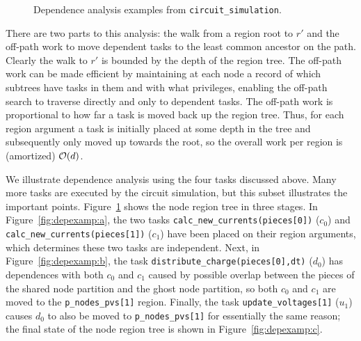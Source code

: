\begin{figure}
\centering
{}
\label{fig:depexamp}
\caption{Dependence analysis examples from {\tt circuit\_simulation}.}
\end{figure}

There are two parts to this analysis:
the walk from a region root to $r'$ and the off-path work
to move dependent tasks to the least common ancestor on the path.
Clearly the walk to $r'$ is bounded by the depth of the region tree.
The off-path work can be made efficient by maintaining at each node a
record of which subtrees have tasks in them and with what privileges,
enabling the off-path search to traverse directly and only to
dependent tasks.  The off-path work is proportional to how far a task
is moved back up the region tree.  Thus, for each region argument a
task is initially placed at some depth in the tree and subsequently
only moved up towards the root, so the overall work per region is (amortized)
${\cal O}(d)$.  

We illustrate dependence analysis using the four tasks discussed
above.  Many more tasks are executed by the circuit simulation,
but this subset illustrates the important
points. Figure~\ref{fig:depexamp} shows the node region tree in three
stages.  In Figure~\ref{fig:depexamp:a}, the two tasks
{\tt calc\_new\_currents(pieces[0])} ($c_0$) and {\tt
    calc\_new\_currents(pieces[1])} ($c_1$) have been placed on their region arguments,
  which determines these two tasks are independent.
Next, in Figure~\ref{fig:depexamp:b}, the task {\tt distribute\_charge(pieces[0],dt)} ($d_0$)
has dependences with both $c_0$ and $c_1$ caused by possible overlap between the pieces of the
shared node partition and the ghost node partition, so both $c_0$ and $c_1$ are moved to
the {\tt p\_nodes\_pvs[1]} region.  Finally, the task {\tt update\_voltages[1]} ($u_1$) causes
$d_0$ to also be moved to {\tt p\_nodes\_pvs[1]} for essentially the same reason; the final
state of the node region tree is shown in Figure~\ref{fig:depexamp:c}.


